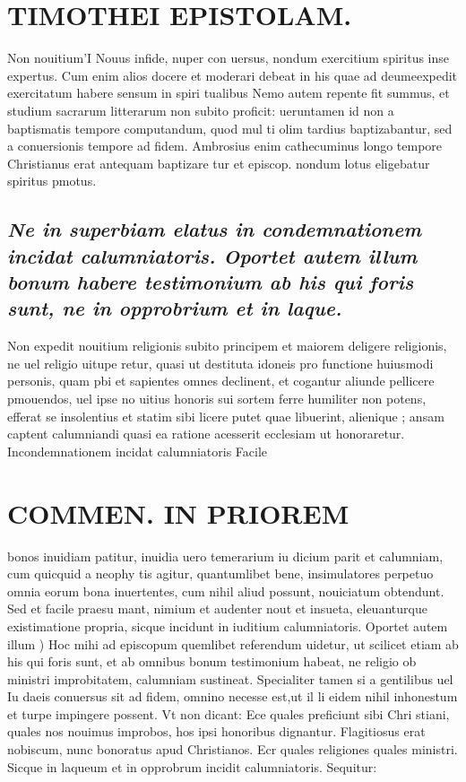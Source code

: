 \documentclass{article}
\begin{document}
\begin{pages}
\section*{TIMOTHEI EPISTOLAM. }
\marginpar{[ p.79 ]}\pstart Non nouitium'I Nouus infide, nuper con uersus, nondum exercitium spiritus inse expertus. Cum enim alios docere et moderari debeat in his quae ad deumeexpedit exercitatum habere sensum in spiri tualibus Nemo autem repente fit summus, et studium sacrarum litterarum non subito proficit: ueruntamen id non a baptismatis tempore computandum, quod mul ti olim tardius baptizabantur, sed a conuersionis tempore ad fidem. Ambrosius enim cathecuminus longo tempore Christianus erat antequam baptizare tur et episcop. nondum lotus eligebatur spiritus pmotus.  \pend
{}
{}
\subsection*{\textit{Ne in superbiam elatus in condemnationem incidat calumniatoris. Oportet autem illum bonum habere testimonium ab his qui foris sunt, ne in opprobrium et in laque. }}\pstart Non expedit nouitium religionis subito principem et maiorem deligere religionis, ne uel religio uitupe retur, quasi ut destituta idoneis pro functione huiusmodi personis, quam pbi et sapientes omnes declinent, et cogantur aliunde pellicere pmouendos, uel ipse no uitius honoris sui sortem ferre humiliter non potens, efferat se insolentius et statim sibi licere putet quae libuerint, alienique ; ansam captent calumniandi quasi ea ratione acesserit ecclesiam ut honoraretur.  \pend\pstart Incondemnationem incidat calumniatoris Facile  \pend
\section*{COMMEN. IN PRIOREM }
\marginpar{[ p.80 ]}\pstart bonos inuidiam patitur, inuidia uero temerarium iu dicium parit et calumniam, cum quicquid a neophy tis agitur, quantumlibet bene, insimulatores perpetuo omnia eorum bona inuertentes, cum nihil aliud possunt, nouiciatum obtendunt. Sed et facile praesu mant, nimium et audenter nout et insueta, eleuanturque existimatione propria, sicque incidunt in iuditium calumniatoris.  \pend\pstart Oportet autem illum ) Hoc mihi ad episcopum quemlibet referendum uidetur, ut scilicet etiam ab his qui foris sunt, et ab omnibus bonum testimonium habeat, ne religio ob ministri improbitatem, calumniam sustineat. Specialiter tamen si a gentilibus uel Iu daeis conuersus sit ad fidem, omnino necesse est,ut il li eidem nihil inhonestum et turpe impingere possent. Vt non dicant: Ece quales preficiunt sibi Chri stiani, quales nos nouimus improbos, hos ipsi honoribus dignantur. Flagitiosus erat nobiscum, nunc bonoratus apud Christianos. Ecr quales religiones quales ministri. Sicque in laqueum et in opprobrum incidit calumniatoris. Sequitur:  \pend
{}
{}

\end{pages}
\end{document}
